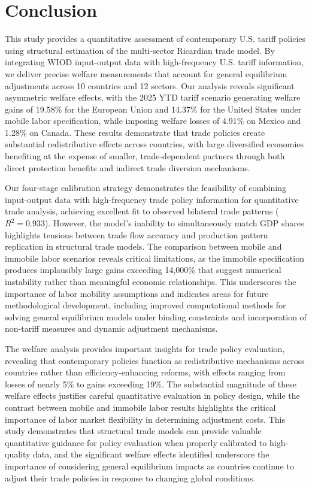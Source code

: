 \section{Conclusion}

This study provides a quantitative assessment of contemporary U.S. tariff policies using structural estimation of the \cite{costinot2012TheReviewofEconomicStudies} multi-sector Ricardian trade model. By integrating WIOD input-output data with high-frequency U.S. tariff information, we deliver precise welfare measurements that account for general equilibrium adjustments across 10 countries and 12 sectors. Our analysis reveals significant asymmetric welfare effects, with the 2025 YTD tariff scenario generating welfare gains of 19.58\% for the European Union and 14.37\% for the United States under mobile labor specification, while imposing welfare losses of 4.91\% on Mexico and 1.28\% on Canada. These results demonstrate that trade policies create substantial redistributive effects across countries, with large diversified economies benefiting at the expense of smaller, trade-dependent partners through both direct protection benefits and indirect trade diversion mechanisms.

Our four-stage calibration strategy demonstrates the feasibility of combining input-output data with high-frequency trade policy information for quantitative trade analysis, achieving excellent fit to observed bilateral trade patterns ($R^2 = 0.933$). However, the model's inability to simultaneously match GDP shares highlights tensions between trade flow accuracy and production pattern replication in structural trade models. The comparison between mobile and immobile labor scenarios reveals critical limitations, as the immobile specification produces implausibly large gains exceeding 14,000\% that suggest numerical instability rather than meaningful economic relationships. This underscores the importance of labor mobility assumptions and indicates areas for future methodological development, including improved computational methods for solving general equilibrium models under binding constraints and incorporation of non-tariff measures and dynamic adjustment mechanisms.

The welfare analysis provides important insights for trade policy evaluation, revealing that contemporary policies function as redistributive mechanisms across countries rather than efficiency-enhancing reforms, with effects ranging from losses of nearly 5\% to gains exceeding 19\%. The substantial magnitude of these welfare effects justifies careful quantitative evaluation in policy design, while the contrast between mobile and immobile labor results highlights the critical importance of labor market flexibility in determining adjustment costs. This study demonstrates that structural trade models can provide valuable quantitative guidance for policy evaluation when properly calibrated to high-quality data, and the significant welfare effects identified underscore the importance of considering general equilibrium impacts as countries continue to adjust their trade policies in response to changing global conditions.
